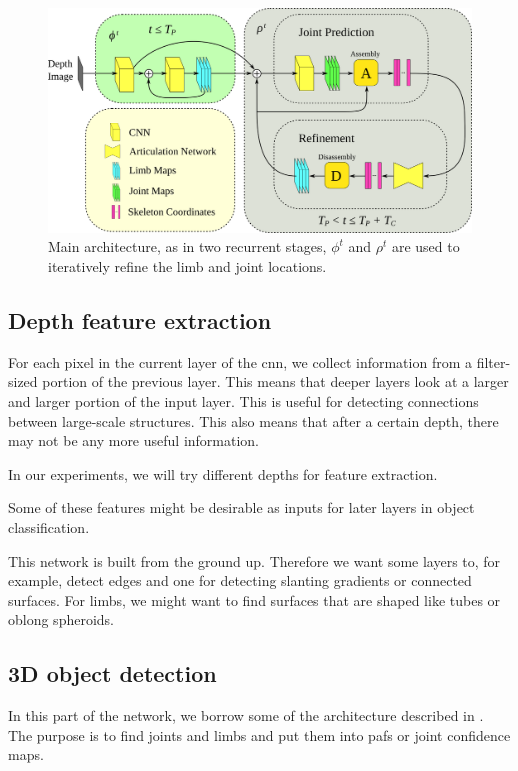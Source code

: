 \begin{figure}[h]
  \centering
  \includegraphics[width=\textwidth]{img/architecture_main}
  \caption[Main architecture]{Main architecture, as in \cite{cao2017realtime} two recurrent stages, $\phi^{t}$ and $\rho^{t}$ are used to iteratively refine the limb and joint locations.}
  \label{fig:arch_main}
\end{figure}

\subsection{Depth feature extraction}\label{subsec:depth_feature}
For each pixel in the current layer of the \gls{cnn}, we collect information from a filter-sized portion of the previous layer. This means that deeper layers look at a larger and larger portion of the input layer. This is useful for detecting connections between large-scale structures. This also means that after a certain depth, there may not be any more useful information.

In our experiments, we will try different depths for feature extraction.

Some of these features might be desirable as inputs for later layers in object classification.

This network is built from the ground up. Therefore we want some layers to, for example, detect edges and one for detecting slanting gradients or connected surfaces. For limbs, we might want to find surfaces that are shaped like tubes or oblong spheroids.

\subsection{3D object detection}\label{subsec:obj_detect}
In this part of the network, we borrow some of the architecture described in \cite{cao2017realtime}. The purpose is to find joints and limbs and put them into \gls{paf}s or joint confidence maps. 

